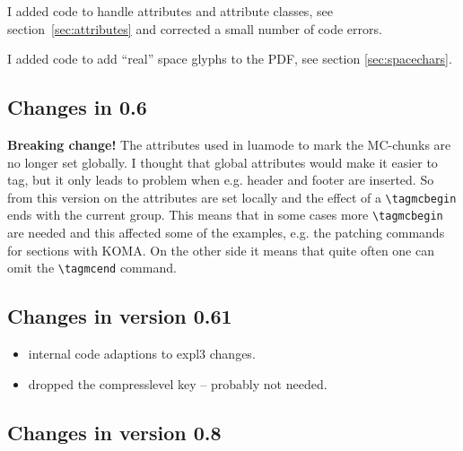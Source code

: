 \documentclass[DIV=12,parskip=half-,bibliography=totoc,a4paper]{article}
\newcommand\PDF{PDF}
\begin{document}
I added code to handle attributes and attribute classes, see section~\ref{sec:attributes} and corrected a small number of code errors.

I added code to add \enquote{real} space glyphs to the \PDF{}, see section \ref{sec:spacechars}.



\subsection{Changes in 0.6}


\textbf{Breaking change!} The attributes used in luamode to mark the MC-chunks are no longer set globally. I thought that global attributes would make it easier to tag, but it only leads to problem when e.g. header and footer are inserted. So from this version on the attributes are set locally and the effect of a \verb+\tagmcbegin+ ends with the current group. This means that in some cases more \verb+\tagmcbegin+ are needed and  this affected some of the examples, e.g. the patching commands for sections with KOMA. On the other side it means that quite often one can omit the \verb+\tagmcend+ command.


\subsection{Changes in version 0.61}

\begin{itemize}
\item internal code adaptions to expl3 changes.
\item dropped the compresslevel key  -- probably not needed.
\end{itemize}


\subsection{Changes in version 0.8}
\end{document}
